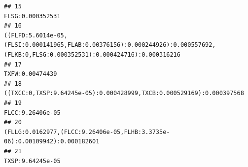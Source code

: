 \documentclass[]{article}
\begin{document}
\begin{verbatim}
## 15                                                                                                                                                                                                                                                                                                                                                                                                                   FLSG:0.000352531
## 16                                                                                                                                                                                                                                                                                                   ((FLFD:5.6014e-05,(FLSI:0.000141965,FLAB:0.00376156):0.000244926):0.000557692,(FLKB:0,FLSG:0.000352531):0.000424716):0.000316216
## 17                                                                                                                                                                                                                                                                                                                                                                                                                    TXFW:0.00474439
## 18                                                                                                                                                                                                                                                                                                                                                               ((TXCC:0,TXSP:9.64245e-05):0.000428999,TXCB:0.000529169):0.000397568
## 19                                                                                                                                                                                                                                                                                                                                                                                                                   FLCC:9.26406e-05
## 20                                                                                                                                                                                                                                                                                                                                                         (FLLG:0.0162977,(FLCC:9.26406e-05,FLHB:3.3735e-06):0.00109942):0.000182601
## 21                                                                                                                                                                                                                                                                                                                                                                                                                   TXSP:9.64245e-05

\end{verbatim}
\end{document}
